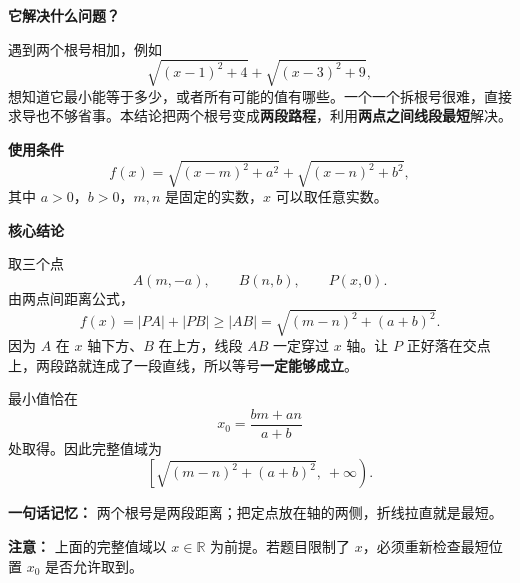\begin{statementbox}
\textbf{\textcolor{CStatement}{它解决什么问题？}}

遇到两个根号相加，例如
\[
  \sqrt{(x-1)^2+4}+\sqrt{(x-3)^2+9},
\]
想知道它最小能等于多少，或者所有可能的值有哪些。一个一个拆根号很难，直接求导也不够省事。本结论把两个根号变成\textbf{两段路程}，利用\textbf{两点之间线段最短}解决。

\medskip
\textbf{\textcolor{CStatement}{使用条件}}
\[
  f(x)=\sqrt{(x-m)^2+a^2}+\sqrt{(x-n)^2+b^2},
\]
其中 $a>0$，$b>0$，$m,n$ 是固定的实数，$x$ 可以取任意实数。



\medskip
\end{statementbox}
\clearpage
\begin{statementbox}
\textbf{\textcolor{CStatement}{核心结论}}

取三个点
\[
 A(m,-a),\qquad B(n,b),\qquad P(x,0).
\]
由两点间距离公式，
\[
  f(x)=|PA|+|PB|\geq |AB|
  =\boxed{\sqrt{(m-n)^2+(a+b)^2}}.
\]
因为 $A$ 在 $x$ 轴下方、$B$ 在上方，线段 $AB$ 一定穿过 $x$ 轴。让 $P$ 正好落在交点上，两段路就连成了一段直线，所以等号\textbf{一定能够成立}。

最小值恰在
\[
 \boxed{x_0=\frac{bm+an}{a+b}}
\]
处取得。因此完整值域为
\[
 \boxed{\left[\sqrt{(m-n)^2+(a+b)^2},\ +\infty\right)}.
\]

\textbf{一句话记忆：} 两个根号是两段距离；把定点放在轴的两侧，折线拉直就是最短。

\medskip
\textbf{\textcolor{CStatement}{注意：}} 上面的完整值域以 $x\in\mathbb R$ 为前提。若题目限制了 $x$，必须重新检查最短位置 $x_0$ 是否允许取到。
\end{statementbox}

